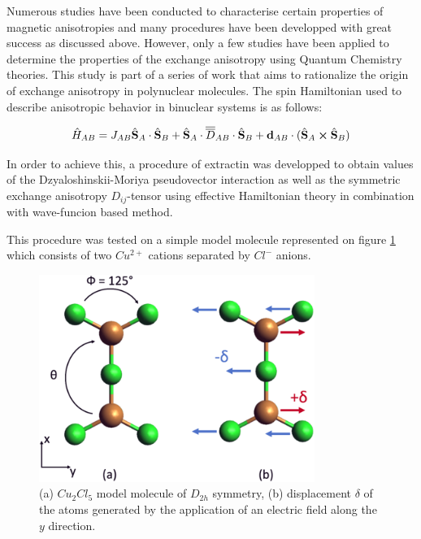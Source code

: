 \documentclass[10pt]{report}
\numberwithin{equation}{section}
\begin{document}
Numerous studies have been conducted to characterise certain properties of magnetic anisotropies and many procedures have been developped with great success as discussed above. 
However, only a few studies have been applied to determine the properties of the exchange anisotropy using Quantum Chemistry theories.
This study is part of a series of work that aims to rationalize the origin of exchange anisotropy in polynuclear molecules.
The spin Hamiltonian used to describe anisotropic behavior in binuclear systems is as follows:

\begin{equation}
    \hat{H}_{AB}=J_{AB}\hat{\vb S}_A \cdot \hat{\vb S}_B + \hat{\vb S}_A \cdot\overline{\overline{D}}_{AB} \cdot \hat{\vb S}_B + \vb{d}_{AB} \cdot (\hat{\vb S}_A \cross \hat{\vb S}_B)
\end{equation}

In order to achieve this, a procedure of extractin was developped to obtain values of the Dzyaloshinskii-Moriya pseudovector interaction as well as the symmetric exchange anisotropy $D_{ij}$-tensor using effective Hamiltonian theory in combination with wave-funcion based method.

This procedure was tested on a simple model molecule represented on figure \ref{MolCu2Cl5} which consists of two $Cu^{2+}$ cations separated by $Cl^-$ anions.
\begin{figure}[h!]
    \centering
    \includegraphics[width=0.8\textwidth]{Images/Cu2Cl5.png}
    \caption{(a) $Cu_2Cl_5$ model molecule of $D_{2h}$ symmetry, (b) displacement $\delta$ of the atoms generated by the application of an electric field along the $y$ direction.}
    \label{MolCu2Cl5}
\end{figure}
\end{document}
